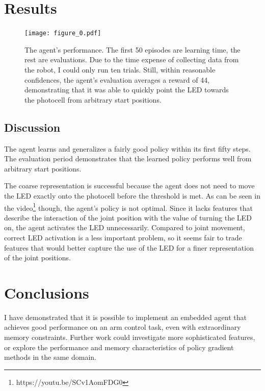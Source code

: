 \documentclass{article}
\begin{document}
	
	\section{Results}

	
		\begin{figure}[h]
			\begin{center}
				\texttt{[image: figure\_0.pdf]}
				\caption{The agent's performance. The first 50 episodes are learning time, the rest are evaluations. Due to the time expense of collecting data from the robot, I could only run ten trials. Still, within reasonable confidences, the agent's evaluation averages a reward of 44, demonstrating that it was able to quickly point the LED towards the photocell from arbitrary start positions.}
			\end{center}
		\end{figure}
		
	\subsection{Discussion}

	The agent learns and generalizes a fairly good policy within its first fifty steps. The evaluation period demonstrates that the learned policy performs well from arbitrary start positions. 
	
	The coarse representation is successful because the agent does not need to move the LED exactly onto the photocell before the threshold is met. As can be seen in the video\footnote{https://youtu.be/SCv1AomFDG0} though, the agent's policy is not optimal. Since it lacks features that describe the interaction of the joint position with the value of turning the LED on, the agent activates the LED unnecessarily. Compared to joint movement, correct LED activation is a less important problem, so it seems fair to trade features that would better capture the use of the LED for a finer representation of the joint positions.
	

	
	\section{Conclusions}

	I have demonstrated that it is possible to implement an embedded agent that achieves good performance on an arm control task, even with extraordinary memory constraints. Further work could investigate more sophisticated features, or explore the performance and memory characteristics of policy gradient methods in the same domain.
	
\end{document}
